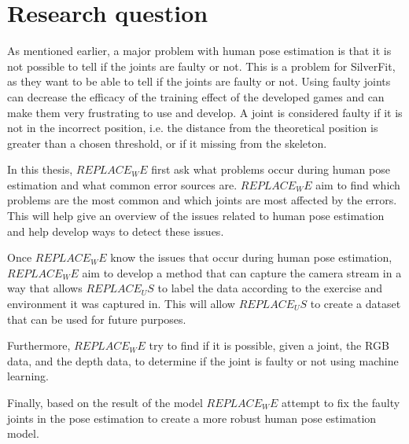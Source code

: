 \section{Research question}

As mentioned earlier, a major problem with human pose estimation is that it is not possible to tell if the joints are faulty or not. This is a problem for SilverFit, as they want to be able to tell if the joints are faulty or not. Using faulty joints can decrease the efficacy of the training effect of the developed games and can make them very frustrating to use and develop. A joint is considered faulty if it is not in the incorrect position, i.e. the distance from the theoretical position is greater than a chosen threshold, or if it missing from the skeleton.

In this thesis, $REPLACE_WE$ first ask what problems occur during human pose estimation and what common error sources are. $REPLACE_WE$ aim to find which problems are the most common and which joints are most affected by the errors. This will help give an overview of the issues related to human pose estimation and help develop ways to detect these issues. 

Once $REPLACE_WE$ know the issues that occur during human pose estimation, $REPLACE_WE$ aim to develop a method that can capture the camera stream in a way that allows $REPLACE_US$ to label the data according to the exercise and environment it was captured in. This will allow $REPLACE_US$ to create a dataset that can be used for future purposes.

Furthermore, $REPLACE_WE$ try to find if it is possible, given a joint, the RGB data, and the depth data, to determine if the joint is faulty or not using machine learning. 

Finally, based on the result of the model $REPLACE_WE$ attempt to fix the faulty joints in the pose estimation to create a more robust human pose estimation model.
